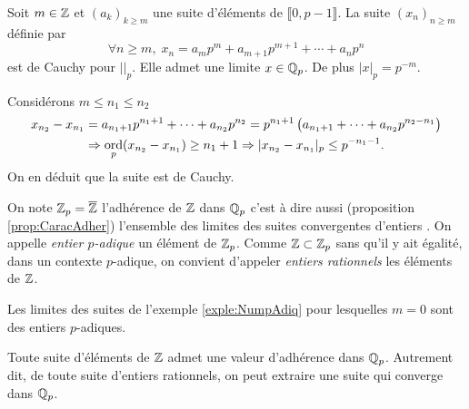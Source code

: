 \begin{explen}\label{exple:NumpAdiq}
Soit $m\in \mathbb{Z}$ et $(a_k)_{k\geq m}$ une suite d'éléments de $\llbracket 0, p-1 \rrbracket$. La suite $(x_n)_{n\geq m}$ définie par
\begin{displaymath}
 \forall n \geq m, \; x_n = a_m p^m + a_{m+1} p^{m+1} + \cdots + a_n p^n
\end{displaymath}
est de Cauchy pour $| |_p$. Elle admet une limite $x \in \mathbb{Q}_p$. De plus $|x|_p = p^{-m}$.
\end{explen}
\begin{demo}
Considérons $m \leq n_1 \leq n_2$
\begin{multline*}
 x_{n_2} -x_{n_1} = a_{n_1+1} p^{n_1+1} + \cdots + a_{n_2} p^{n_2}
                  = p^{n_1+1} \left( a_{n_1+1} + \cdots + a_{n_2} p^{n_2 - n_1}\right) \\
      \Rightarrow \mathop{\mathrm{ord}}_p(x_{n_2} -x_{n_1}) \geq n_1 + 1 \Rightarrow |x_{n_2} -x_{n_1}|_p \leq p^{-n_1 - 1}.
\end{multline*}
On en déduit que la suite est de Cauchy.
\end{demo}
 
\begin{defi}
 On note $\mathbb{Z}_p = \overline{\mathbb{Z}}$ l'adhérence de $\mathbb{Z}$ dans $\mathbb{Q}_p$ c'est à dire aussi (proposition \ref{prop:CaracAdher}) l'ensemble des limites des suites convergentes d'entiers .  On appelle \emph{entier $p$-adique} un élément de $\mathbb{Z}_p$. Comme $\mathbb{Z} \subset \mathbb{Z}_p$ sans qu'il y ait égalité, dans un contexte $p$-adique, on convient d'appeler \emph{entiers rationnels} les éléments de $\mathbb{Z}$.
\end{defi}
\noindent Les limites des suites de l'exemple \ref{exple:NumpAdiq} pour lesquelles $m=0$ sont des entiers $p$-adiques.
\begin{propn}
 Toute suite d'éléments de $\mathbb{Z}$ admet une valeur d'adhérence dans $\mathbb{Q}_p$. Autrement dit, de toute suite d'entiers rationnels, on peut extraire une suite qui converge dans $\mathbb{Q}_p$.
\end{propn}
